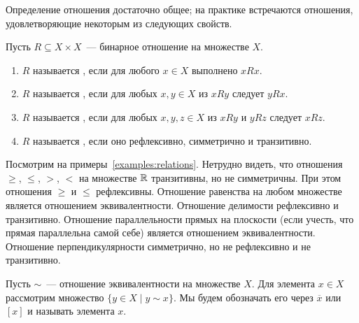 Определение отношения достаточно общее; на практике встречаются
отношения,
удовлетворяющие некоторым из следующих свойств.

\begin{definition}
Пусть $R\subseteq X\times X$~--- бинарное отношение на множестве $X$.
\begin{enumerate}
\item $R$ называется ,
  если для любого $x\in X$
  выполнено $xRx$.
\item $R$ называется ,
  если для любых $x,y\in X$ из
  $xRy$ следует $yRx$.
\item $R$ называется ,
  если для любых $x,y,z\in X$
  из $xRy$ и $yRz$ следует $xRz$.
\item $R$ называется , если оно
  рефлексивно, симметрично и транзитивно.
\end{enumerate}
\end{definition}

\begin{examples}
Посмотрим на примеры~\ref{examples:relations}.
Нетрудно видеть, что отношения $\geq$, $\leq$, $>$, $<$ на множестве
$\mathbb R$ транзитивны, но не симметричны. При этом отношения $\geq$ и
$\leq$ рефлексивны. Отношение равенства на любом множестве является
отношением эквивалентности. Отношение делимости рефлексивно и
транзитивно. Отношение параллельности прямых на плоскости (если
учесть, что прямая параллельна самой себе) является отношением
эквивалентности. Отношение перпендикулярности симметрично, но не
рефлексивно и не транзитивно.
\end{examples}

\begin{definition}\label{def_equiv_class}
Пусть $\sim$~--- отношение эквивалентности на множестве $X$. Для
элемента $x\in X$ рассмотрим множество $\{y\in X\mid y\sim x\}$. Мы
будем обозначать его через $\overline{x}$ или $[x]$ и называть
 элемента $x$.
\end{definition}

